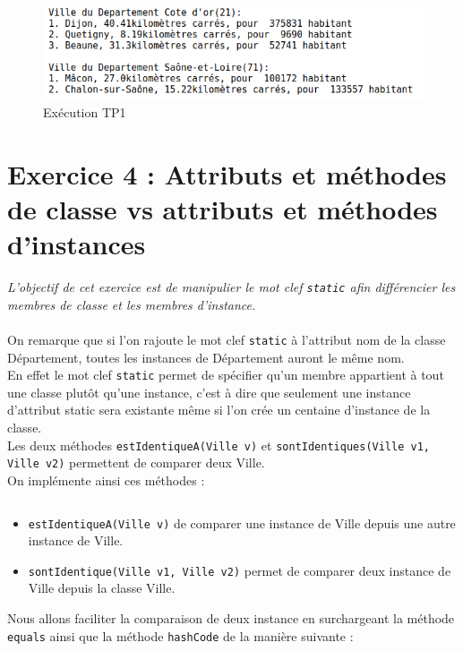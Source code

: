 \begin{figure}[H]
  \centering
  \includegraphics[width=350pt]{./tp/Pictures/tp1-execute}
  \caption{Exécution TP1}
  \label{Exécution TP1}
\end{figure}

\section{Exercice 4 : Attributs et méthodes de classe vs attributs et méthodes d'instances}
\textit{L'objectif de cet exercice est de manipulier le mot clef \texttt{static} afin différencier les membres de classe et les membres d'instance.}
\\\\
On remarque que si l'on rajoute le mot clef \texttt{static} à l'attribut nom de la classe Département, toutes les instances de Département auront le même nom.\\
En effet le mot clef \texttt{static} permet de spécifier qu'un membre appartient à tout une classe plutôt qu'une instance, c'est à dire que seulement une instance d'attribut static sera existante même si l'on crée un centaine d'instance de la classe.\\
Les deux méthodes \texttt{estIdentiqueA(Ville v)} et \texttt{sontIdentiques(Ville v1, Ville v2)} permettent de comparer deux Ville.\\
On implémente ainsi ces méthodes :

\inputminted[linenos,firstline=58,lastline=69]{java}{../sources/src/tp1/Ville.java}

\begin{itemize}
  \item \texttt{estIdentiqueA(Ville v)} de comparer une instance de Ville depuis une autre instance de Ville.
  \item \texttt{sontIdentique(Ville v1, Ville v2)} permet de comparer deux instance de Ville depuis la classe Ville.
\end{itemize}

Nous allons faciliter la comparaison de deux instance en surchargeant la méthode \texttt{equals} ainsi que la méthode \texttt{hashCode} de la manière suivante :
\inputminted[linenos,firstline=71,lastline=88]{java}{../sources/src/tp1/Ville.java}
